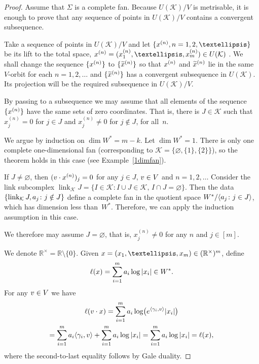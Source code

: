 \documentclass[10pt,a4paper]{amsart}
\def\R{\mathbb R}
\def\sK{\mathcal K}
\newcommand{\mb}[1]{{\textbf {\textit#1}}}
\begin{document}
\begin{proof}
Assume that $\Sigma$ is a complete fan.
Because $U(\sK)/V$ is metrisable, it is enough to prove that any sequence of points in $U(\sK)/V$ contains a convergent subsequence.

Take a sequence of points in $U(\sK)/V$ and let $\{\mb x^{(n)},n=1,2,\ldots\}$ be its lift to the total space, $\mb x^{(n)}=(x_1^{(n)} , \dots , x_m^{(n)}) \in U(\sK)$ . We shall change the sequence $\{\mb x^{(n)}\}$ to $\{\widetilde{\mb x}^{(n)}\}$ so that $\mb x^{(n)}$ and $\widetilde{\mb x}^{(n)}$ lie in the same $V$-orbit for each $n=1,2,\ldots$ and $\{\widetilde{\mb x}^{(n)}\}$ has a convergent  subsequence  in $U(\sK)$. Its projection will be the required subsequence in $U(\sK)/V$. 

By passing to a subsequence we may assume that  all elements of the sequence $\{\mb x^{(n)}\}$ have the same sets of zero coordinates. That is, there is $J\in\sK$ such that $x^{(n)}_j=0$ for $j\in J$ and $x^{(n)}_j\ne0$ for $j\notin J$, for all~$n$.

We argue by induction on $\dim W^*=m-k$. Let $\dim W^*=1$.  There is only one complete one-dimensional fan (corresponding to $\sK=\{\varnothing,\{1\},\{2\}\}$), so the theorem holds in this case (see Example~\ref{1dimfan}).

If $J\ne\varnothing$, then $(\mb v\cdot\mb x^{(n)})_j=0$ for any $j\in J$, $\mb v\in V$ and $n=1,2,\ldots$ Consider the link subcomplex $\mathop\mathrm{link}_{\sK}J=\{I\in\sK\colon I\cup J\in\sK,\,I\cap J=\varnothing\}$. Then the data 
$\{\mathop\mathrm{link}_{\sK}J,\mb a_j\colon j\notin J\}$ define a complete fan in the quotient space $W^*/\langle\mb a_j\colon j\in J\rangle$, which has dimension less than~$W^*$. Therefore, we can apply the induction assumption in this case.

We therefore may assume $J=\varnothing$, that is, $x_j^{(n)}\ne0$ for any $n$ and $j\in[m]$.

We denote $\R^\times=\R\setminus\{0\}$. Given $\mb x=(x_1,\ldots,x_m)\in(\R^\times)^m$, define 
\[
  \ell(\mb x)=\sum_{i=1}^m\mb a_i\log|x_i|\in W^*.
\]
For any $\mb v\in V$ we have
\begin{multline}\label{lconst}
\ell(\mb v\cdot\mb x)=\sum_{i=1}^m\mb a_i\log\bigl(e^{\langle\gamma_i,\mb v\rangle}|x_i|\bigr)
\\=\sum_{i=1}^m\mb a_i\langle\gamma_i,\mb v\rangle+\sum_{i=1}^m\mb a_i\log|x_i|=\sum_{i=1}^m\mb a_i\log|x_i|=\ell(\mb x),
\end{multline}
where the second-to-last equality follows by Gale duality.


\end{proof}
\end{document}
